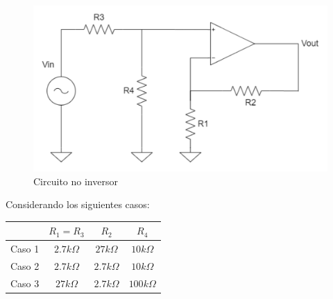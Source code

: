 \begin{figure}[H]
	\centering
	\includegraphics[scale=0.3]{./Imagenes/circNoInversor.png}
	\caption{Circuito no inversor}
	\label{fig:circNoInv}
\end{figure}

Considerando los siguientes casos:

\begin{table}[H]
\centering
\begin{tabular}{c|ccc}
       & $R_{1}=R_{3}$ &   $R_{2}$   & $R_{4}$   \\ \hline
Caso 1 & $2.7k\Omega$  & $27k\Omega$  & $10k\Omega$  \\
Caso 2 & $2.7k\Omega$  & $2.7k\Omega$ & $10k\Omega$  \\
Caso 3 & $27k\Omega$   & $2.7k\Omega$ & $100k\Omega$
\end{tabular}
\end{table}
